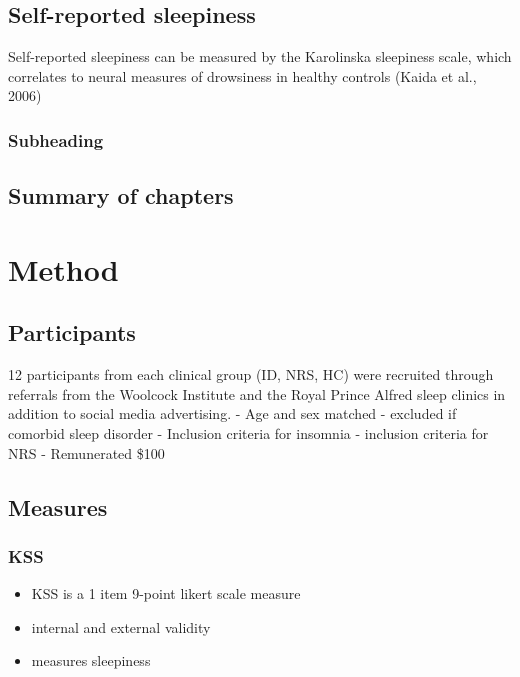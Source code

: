 \documentclass[12pt,a4paper,]{report}
\providecommand{\tightlist}{%
  \setlength{\itemsep}{0pt}\setlength{\parskip}{0pt}}
\begin{document}
\section{Self-reported sleepiness}\label{self-reported-sleepiness-1}

Self-reported sleepiness can be measured by the Karolinska sleepiness
scale, which correlates to neural measures of drowsiness in healthy
controls (Kaida et al., 2006)

\subsection{Subheading}\label{subheading-1}

\section{Summary of chapters}\label{summary-of-chapters-1}

\newpage

\chapter{Method}\label{sec:method}

\section{Participants}\label{participants-1}

12 participants from each clinical group (ID, NRS, HC) were recruited
through referrals from the Woolcock Institute and the Royal Prince
Alfred sleep clinics in addition to social media advertising. - Age and
sex matched - excluded if comorbid sleep disorder - Inclusion criteria
for insomnia - inclusion criteria for NRS - Remunerated \$100

\section{Measures}\label{measures-1}

\subsection{KSS}\label{kss-1}

\begin{itemize}
\tightlist
\item
  KSS is a 1 item 9-point likert scale measure
\item
  internal and external validity
\item
  measures sleepiness
\end{itemize}
\end{document}
